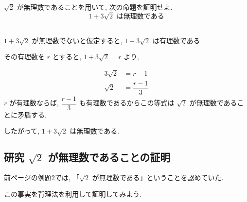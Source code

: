 \begin{exercise}[【教p.67 練習19】]
    $\sqrt{2}$ が無理数であることを用いて, 次の命題を証明せよ.
    \[1 + 3\sqrt{2} \text{ は無理数である}\]
\end{exercise}

\begin{problemsolution}\\\hspace{1em}%
    $1 + 3\sqrt{2}$ が無理数でないと仮定すると, $1 + 3\sqrt{2}$ は有理数である.

    その有理数を $r$ とすると, $1 + 3\sqrt{2} = r$ より,

    \begin{align*}
        3\sqrt{2} &= r - 1 \\
        \sqrt{2} &= \dfrac{r - 1}{3}
    \end{align*}
    $r$ が有理数ならば, $\dfrac{r - 1}{3}$ も有理数であるからこの等式は $\sqrt{2}$ が無理数であることに矛盾する.

    したがって, $1 + 3\sqrt{2}$ は無理数である.
\end{problemsolution}
\newpage

\subsection{研究 \quad $\sqrt{2}$ が無理数であることの証明}

前ページの例題2では, 「$\sqrt{2}$ が無理数である」ということを認めていた.

この事実を背理法を利用して証明してみよう.

